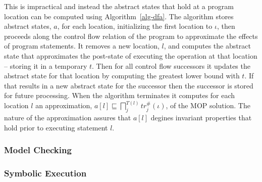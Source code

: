 This is impractical and instead the abstract states that hold at a
program location can be computed using Algorithm~\ref{alg-dfa}.
The algorithm stores abstract states, $a$, for each location, initializing
the first location to $\iota$, then proceeds along the control
flow relation of the program to approximate the effects of program
statements.  It removes a new location, $l$, and computes the abstract
state that approximates the post-state of executing the operation
at that location -- storing it in a temporary $t$.  Then for
all control flow successors it updates the abstract state for
that location by computing the greatest lower bound with $t$.
If that results in a new abstract state for the successor then
the successor is stored for future processing.  When the algorithm
terminates it computes for each location $l$ an approximation,
$a[l] \sqsubseteq \displaystyle\bigsqcap_j^{T(l)} tr_j^\#(\iota)$, 
of the MOP solution.
The nature of the approximation assures that $a[l]$ degines
invariant properties that hold prior to executing statement $l$.


\subsubsection{Model Checking}

\subsubsection{Symbolic Execution}


